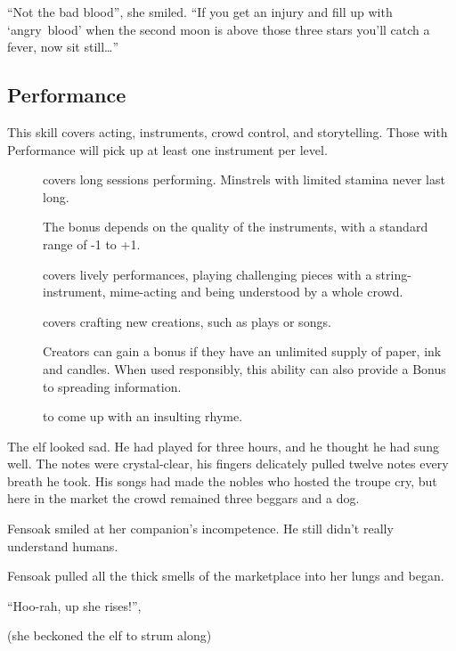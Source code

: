 \begin{multicols}{2}
\begin{exampletext}
  ``Not the bad blood'', she smiled.
  ``If you get an injury and fill up with `angry~blood' when the second moon is above those three stars you'll catch a fever, now sit still\ldots''
\end{exampletext}

\subsection{Performance}

This \gls{skill} covers acting, instruments, crowd control, and storytelling.
Those with Performance will pick up at least one instrument per level.

\begin{description}
  \item[]
    covers long sessions performing.
    Minstrels with limited stamina never last long.

    The bonus depends on the quality of the instruments, with a standard range of -1 to +1.
  \item[]
    covers lively performances, playing challenging pieces with a string-instrument, mime-acting and being understood by a whole crowd.
  \item[]
    covers crafting new creations, such as plays or songs.

    Creators can gain a bonus if they have an unlimited supply of paper, ink and candles.
    When used responsibly, this ability can also provide a Bonus to spreading information.
  \item[]
    to come up with an insulting rhyme.
\end{description}

\begin{exampletext}
  The elf looked sad.
  He had played for three hours, and he thought he had sung well.
  The notes were crystal-clear, his fingers delicately pulled twelve notes every breath he took.
  His songs had made the nobles who hosted the troupe cry, but here in the market the crowd remained three beggars and a dog.

  Fensoak smiled at her companion's incompetence.
  He still didn't really understand humans.

  Fensoak pulled all the thick smells of the marketplace into her lungs and began.

  ``Hoo-rah, up she rises!'',

  (she beckoned the elf to strum along)


\end{exampletext}
\end{multicols}
